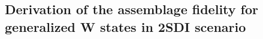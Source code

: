 \documentclass[reprint,superscriptaddress,nofootinbib,amsmath,amssymb,aps,pra,longbibliography]{revtex4-1}
\begin{document}
\begin{widetext}

\section{Derivation of the assemblage fidelity for generalized W states in 2SDI scenario }\label{app10}


\end{widetext}
\end{document}
